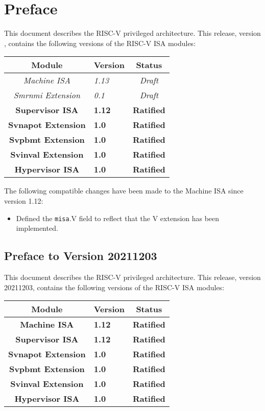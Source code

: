 \chapter{Preface}

This document describes the RISC-V privileged architecture.
This release, version \privrev, contains the following versions of the RISC-V
ISA modules:

{
\begin{table}[hbt]
  \centering
  \begin{tabular}{|c|l|c|}
    \hline
    Module                & Version  & Status\\
    \hline
    \em Machine ISA       & \em 1.13 & \em Draft \\
    \em Smrnmi Extension  & \em 0.1  & \em Draft \\
    \bf Supervisor ISA    & \bf 1.12 & \bf Ratified \\
    \bf Svnapot Extension & \bf 1.0  & \bf Ratified \\
    \bf Svpbmt Extension  & \bf 1.0  & \bf Ratified \\
    \bf Svinval Extension & \bf 1.0  & \bf Ratified \\
    \bf Hypervisor ISA    & \bf 1.0  & \bf Ratified \\
    \hline
  \end{tabular}
\end{table}
}

The following compatible changes have been made to the Machine ISA since version 1.12:
\vspace{-0.2in}
\begin{itemize}
  \parskip 0pt
  \itemsep 1pt
\item Defined the {\tt misa}.V field to reflect that the V extension has been implemented.
\end{itemize}

\section*{Preface to Version 20211203}

This document describes the RISC-V privileged architecture.
This release, version 20211203, contains the following versions of the RISC-V
ISA modules:

{
\begin{table}[hbt]
  \centering
  \begin{tabular}{|c|l|c|}
    \hline
    Module                & Version  & Status\\
    \hline
    \bf Machine ISA       & \bf 1.12 & \bf Ratified \\
    \bf Supervisor ISA    & \bf 1.12 & \bf Ratified \\
    \bf Svnapot Extension & \bf 1.0  & \bf Ratified \\
    \bf Svpbmt Extension  & \bf 1.0  & \bf Ratified \\
    \bf Svinval Extension & \bf 1.0  & \bf Ratified \\
    \bf Hypervisor ISA    & \bf 1.0  & \bf Ratified \\
    \hline
  \end{tabular}
\end{table}
}

